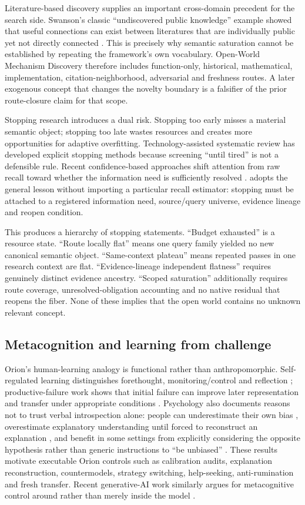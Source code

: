 Literature-based discovery supplies an important cross-domain precedent for the search side. Swanson's classic ``undiscovered public knowledge'' example showed that useful connections can exist between literatures that are individually public yet not directly connected \cite{swanson1986}. This is precisely why semantic saturation cannot be established by repeating the framework's own vocabulary. Open-World Mechanism Discovery therefore includes function-only, historical, mathematical, implementation, citation-neighborhood, adversarial and freshness routes. A later exogenous concept that changes the novelty boundary is a falsifier of the prior route-closure claim for that scope.

Stopping research introduces a dual risk. Stopping too early misses a material semantic object; stopping too late wastes resources and creates more opportunities for adaptive overfitting. Technology-assisted systematic review has developed explicit stopping methods because screening ``until tired'' is not a defensible rule. Recent confidence-based approaches shift attention from raw recall toward whether the information need is sufficiently resolved \cite{fletcher2026stopping}. \RAKL{} adopts the general lesson without importing a particular recall estimator: stopping must be attached to a registered information need, source/query universe, evidence lineage and reopen condition.

This produces a hierarchy of stopping statements. ``Budget exhausted'' is a resource state. ``Route locally flat'' means one query family yielded no new canonical semantic object. ``Same-context plateau'' means repeated passes in one research context are flat. ``Evidence-lineage independent flatness'' requires genuinely distinct evidence ancestry. ``Scoped saturation'' additionally requires route coverage, unresolved-obligation accounting and no native residual that reopens the fiber. None of these implies that the open world contains no unknown relevant concept.

\subsection{Metacognition and learning from challenge}
Orion's human-learning analogy is functional rather than anthropomorphic. Self-regulated learning distinguishes forethought, monitoring/control and reflection \cite{zimmerman2002}; productive-failure work shows that initial failure can improve later representation and transfer under appropriate conditions \cite{kapur2008}. Psychology also documents reasons not to trust verbal introspection alone: people can underestimate their own bias \cite{pronin2002}, overestimate explanatory understanding until forced to reconstruct an explanation \cite{rozenblit2002}, and benefit in some settings from explicitly considering the opposite hypothesis rather than generic instructions to ``be unbiased'' \cite{lord1984}. These results motivate executable Orion controls such as calibration audits, explanation reconstruction, countermodels, strategy switching, help-seeking, anti-rumination and fresh transfer. Recent generative-AI work similarly argues for metacognitive control around rather than merely inside the model \cite{ji2026}.


